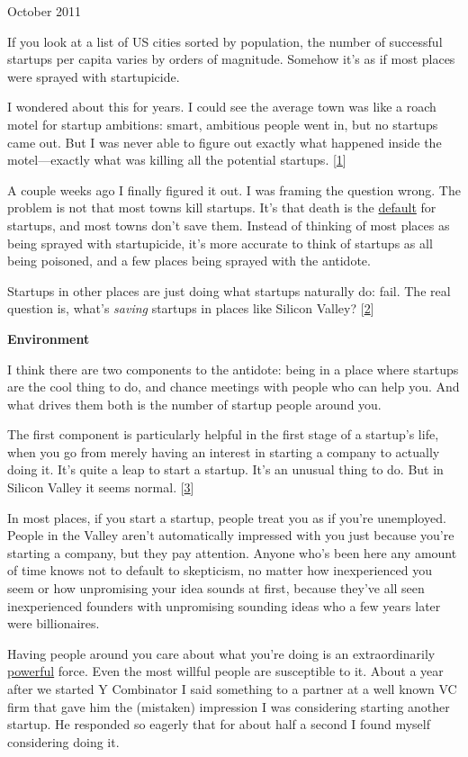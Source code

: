 October 2011

If you look at a list of US cities sorted by population, the number of
successful startups per capita varies by orders of magnitude. Somehow
it's as if most places were sprayed with startupicide.

I wondered about this for years. I could see the average town was like a
roach motel for startup ambitions: smart, ambitious people went in, but
no startups came out. But I was never able to figure out exactly what
happened inside the motel---exactly what was killing all the potential
startups. {[}\hyperref[f1n]{1}{]}

A couple weeks ago I finally figured it out. I was framing the question
wrong. The problem is not that most towns kill startups. It's that death
is the \href{die.html}{default} for startups, and most towns don't save
them. Instead of thinking of most places as being sprayed with
startupicide, it's more accurate to think of startups as all being
poisoned, and a few places being sprayed with the antidote.

Startups in other places are just doing what startups naturally do:
fail. The real question is, what's \emph{saving} startups in places like
Silicon Valley? {[}\hyperref[f2n]{2}{]}

\textbf{Environment}

I think there are two components to the antidote: being in a place where
startups are the cool thing to do, and chance meetings with people who
can help you. And what drives them both is the number of startup people
around you.

The first component is particularly helpful in the first stage of a
startup's life, when you go from merely having an interest in starting a
company to actually doing it. It's quite a leap to start a startup. It's
an unusual thing to do. But in Silicon Valley it seems normal.
{[}\hyperref[f3n]{3}{]}

In most places, if you start a startup, people treat you as if you're
unemployed. People in the Valley aren't automatically impressed with you
just because you're starting a company, but they pay attention. Anyone
who's been here any amount of time knows not to default to skepticism,
no matter how inexperienced you seem or how unpromising your idea sounds
at first, because they've all seen inexperienced founders with
unpromising sounding ideas who a few years later were billionaires.

Having people around you care about what you're doing is an
extraordinarily \href{cities.html}{powerful} force. Even the most
willful people are susceptible to it. About a year after we started Y
Combinator I said something to a partner at a well known VC firm that
gave him the (mistaken) impression I was considering starting another
startup. He responded so eagerly that for about half a second I found
myself considering doing it.

